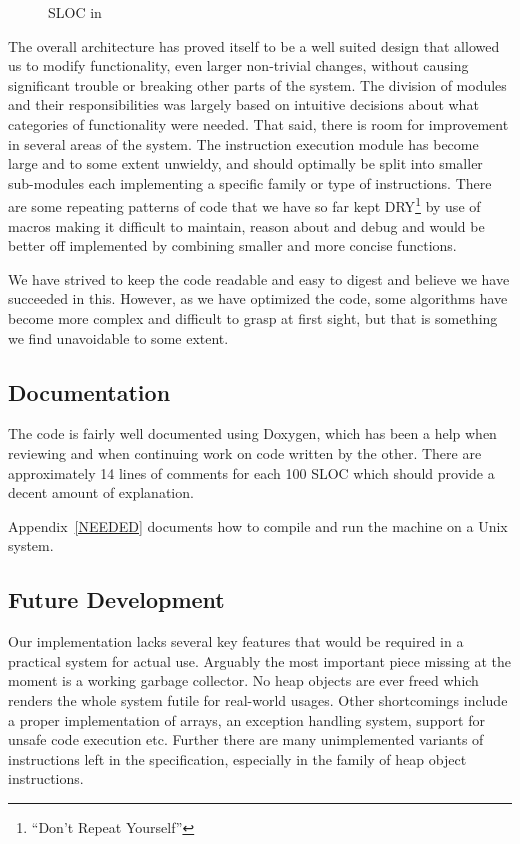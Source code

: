 \begin{figure}
  \centering
  
  \caption{SLOC in \thename{}}
\label{fig:eval:sloc}
\end{figure}

The overall architecture has proved itself to be a well suited design that
allowed us to modify functionality, even larger non-trivial changes, without
causing significant trouble or breaking other parts of the system. The division
of modules and their responsibilities was largely based on intuitive decisions
about what categories of functionality were needed. That said, there is room for
improvement in several areas of the system. The instruction execution module has
become large and to some extent unwieldy, and should optimally be split into
smaller sub-modules each implementing a specific family or type of
instructions. There are some repeating patterns of code that we have so far kept
DRY\footnote{``Don't Repeat Yourself''} by use of macros making it difficult to
maintain, reason about and debug and would be better off implemented by
combining smaller and more concise functions.

We have strived to keep the code readable and easy to digest and believe we have
succeeded in this. However, as we have optimized the code, some algorithms have
become more complex and difficult to grasp at first sight, but that is something
we find unavoidable to some extent.

\subsection{Documentation}

The code is fairly well documented using Doxygen, which has been a help when
reviewing and when continuing work on code written by the other. There are
approximately 14 lines of comments for each 100 SLOC which should provide a
decent amount of explanation.

Appendix~\ref{NEEDED} documents how to compile and run the machine on a Unix
system.

\subsection{Future Development}

Our \thename{} implementation lacks several key features that would be required
in a practical system for actual use. Arguably the most important piece missing
at the moment is a working garbage collector. No heap objects are ever freed
which renders the whole system futile for real-world usages. Other shortcomings
include a proper implementation of arrays, an exception handling system, support
for unsafe code execution etc. Further there are many unimplemented variants of
instructions left in the specification, especially in the family of heap object
instructions.

